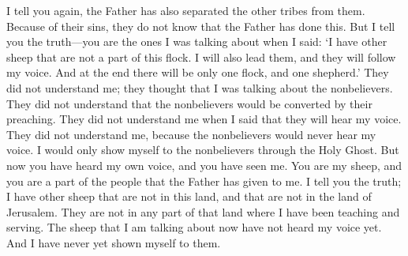 \bverse \iffalse And verily, I say unto you again that the other tribes hath the Father separated from them; and it is because of their iniquity that they know not of them. \fi
I tell you again, the Father has also separated the other tribes from them. Because of their sins, they do not know that the Father has done this.
\bverse \iffalse And verily I say unto you, that ye are they of whom I said: Other sheep I have which are not of this fold; them also I must bring, and they shall hear my voice; and there shall be one fold, and one shepherd. \fi
But I tell you the truth---you are the ones I was talking about when I said: \lq I have other sheep that are not a part of this flock. I will also lead them, and they will follow my voice. And at the end there will be only one flock, and one shepherd.\rq
\bverse \iffalse And they understood me not, for they supposed it had been the Gentiles; for they understood not that the Gentiles should be converted through their preaching. \fi
They did not understand me; they thought that I was talking about the nonbelievers. They did not understand that the nonbelievers would be converted by their preaching.
\bverse \iffalse And they understood me not that I said they shall hear my voice; and they understood me not that the Gentiles should not at any time hear my voice--that I should not manifest myself unto them save it were by the Holy Ghost. \fi
They did not understand me when I said that they will hear my voice. They did not understand me, because the nonbelievers would never hear my voice. I would only show myself to the nonbelievers through the Holy Ghost.
\bverse \iffalse But behold, ye have both heard my voice, and seen me; and ye are my sheep, and ye are numbered among those whom the Father hath given me. \fi
But now you have heard my own voice, and you have seen me. You are my sheep, and you are a part of the people that the Father has given to me.
\bchapter
\bverse \iffalse And verily, verily, I say unto you that I have other sheep which are not of this land, neither of the land of Jerusalem, neither in any parts of that land round about whither I have been to minister. \fi
I tell you the truth; I have other sheep that are not in this land, and that are not in the land of Jerusalem. They are not in any part of that land where I have been teaching and serving.
\bverse \iffalse For they of whom I speak are they who have not as yet heard my voice; neither have I at any time manifested myself unto them. \fi
The sheep that I am talking about now have not heard my voice yet. And I have never yet shown myself to them.
